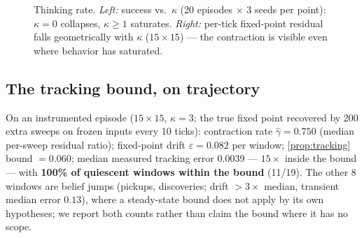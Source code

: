 \documentclass[11pt]{article}
\begin{document}
\begin{figure}[t]
\centering
{}\hfill
{}
\caption{Thinking rate. \emph{Left:} success vs.\ $\kappa$ (20 episodes $\times$ 3 seeds per point): $\kappa{=}0$ collapses, $\kappa{\ge}1$ saturates. \emph{Right:} per-tick fixed-point residual falls geometrically with $\kappa$ ($15{\times}15$) --- the contraction is visible even where behavior has saturated.}
\label{fig:kappa}
\end{figure}

\subsection{The tracking bound, on trajectory}
\label{sec:tracking}
On an instrumented episode ($15{\times}15$, $\kappa{=}3$; the true fixed point recovered by 200 extra sweeps on frozen inputs every 10 ticks): contraction rate $\hat\gamma = 0.750$ (median per-sweep residual ratio); fixed-point drift $\varepsilon = 0.082$ per window; \cref{prop:tracking} bound $= 0.060$; median measured tracking error $\mathbf{0.0039}$ --- $15\times$ inside the bound --- with \textbf{100\% of quiescent windows within the bound} (11/19). The other 8 windows are belief jumps (pickups, discoveries; drift $>3\times$ median, transient median error $0.13$), where a steady-state bound does not apply by its own hypotheses; we report both counts rather than claim the bound where it has no scope.
\end{document}
